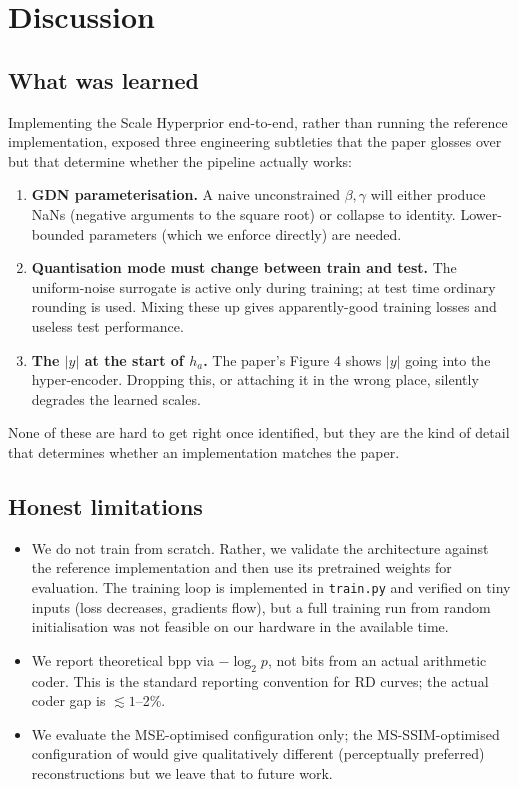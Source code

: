 \documentclass[review]{elsarticle}
\begin{document}
\section{Discussion}
\label{sec:discussion}

\subsection{What was learned}
Implementing the Scale Hyperprior end-to-end, rather than running the reference implementation, exposed three engineering subtleties that the paper glosses over but that determine whether the pipeline actually works:
\begin{enumerate}
\item \textbf{GDN parameterisation.} A naive unconstrained $\beta, \gamma$ will either produce NaNs (negative arguments to the square root) or collapse to identity. Lower-bounded parameters (which we enforce directly) are needed.
\item \textbf{Quantisation mode must change between train and test.} The uniform-noise surrogate is active only during training; at test time ordinary rounding is used. Mixing these up gives apparently-good training losses and useless test performance.
\item \textbf{The $|y|$ at the start of $h_a$.} The paper's Figure 4 shows $|y|$ going into the hyper-encoder. Dropping this, or attaching it in the wrong place, silently degrades the learned scales.
\end{enumerate}
None of these are hard to get right once identified, but they are the kind of detail that determines whether an implementation matches the paper.

\subsection{Honest limitations}
\begin{itemize}
\item We do not train from scratch. Rather, we validate the architecture against the reference implementation and then use its pretrained weights for evaluation. The training loop is implemented in \texttt{train.py} and verified on tiny inputs (loss decreases, gradients flow), but a full training run from random initialisation was not feasible on our hardware in the available time.
\item We report theoretical bpp via $-\log_2 p$, not bits from an actual arithmetic coder. This is the standard reporting convention for RD curves; the actual coder gap is $\lesssim 1$--2\%.
\item We evaluate the MSE-optimised configuration only; the MS-SSIM-optimised configuration of \cite{balle2018} would give qualitatively different (perceptually preferred) reconstructions but we leave that to future work.
\end{itemize}
\end{document}

